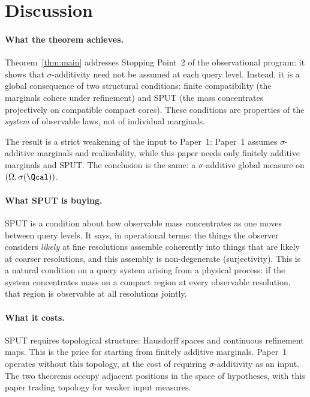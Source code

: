 \section{Discussion}\label{sec:discussion}

\paragraph{What the theorem achieves.}
Theorem~\ref{thm:main} addresses Stopping Point~2 of the
observational program: it shows that $\sigma$-additivity need not
be assumed at each query level.  Instead, it is a global consequence
of two structural conditions: finite compatibility (the marginals
cohere under refinement) and SPUT (the mass concentrates
projectively on compatible compact cores).  These conditions are
properties of the \emph{system} of observable laws, not of
individual marginals.

The result is a strict weakening of the input to Paper~1:
Paper~1 assumes $\sigma$-additive marginals and realizability,
while this paper needs only finitely additive marginals and SPUT.
The conclusion is the same: a $\sigma$-additive global measure on
$(\Omega, \sigma(\Qcal))$.

\paragraph{What SPUT is buying.}
SPUT is a condition about how observable mass concentrates as one
moves between query levels.  It says, in operational terms: the
things the observer considers \emph{likely} at fine resolutions
assemble coherently into things that are likely at coarser
resolutions, and this assembly is non-degenerate (surjectivity).
This is a natural condition on a query system arising from a
physical process: if the system concentrates mass on a compact
region at every observable resolution, that region is observable
at all resolutions jointly.

\paragraph{What it costs.}
SPUT requires topological structure: Hausdorff spaces and continuous
refinement maps.  This is the price for starting from finitely
additive marginals.  Paper~1 operates without this topology, at
the cost of requiring $\sigma$-additivity as an input.  The two
theorems occupy adjacent positions in the space of hypotheses,
with this paper trading topology for weaker input measures.

